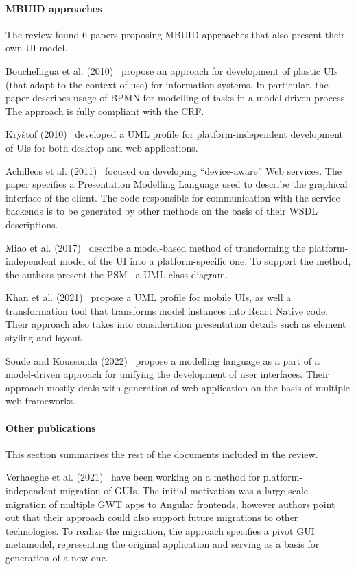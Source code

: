 \paragraph{MBUID approaches}

The review found 6 papers proposing MBUID approaches that also present their own UI model.

Bouchelligua et al. (2010)~\cite{Bouchelligua2010} propose an approach for development of plastic UIs (that adapt to the context of use) for information systems.
In particular, the paper describes usage of BPMN for modelling of tasks in a model-driven process.
The approach is fully compliant with the CRF\@.

Kryštof (2010)~\cite{kryvstof2010lpgm} developed a UML profile for platform-independent development of UIs for both desktop and web applications.

Achilleos et al. (2011)~\cite{Achilleos2011} focused on developing \enquote{device-aware} Web services.
The paper specifies a Presentation Modelling Language used to describe the graphical interface of the client.
The code responsible for communication with the service backends is to be generated by other methods on the basis of their WSDL descriptions.

Miao et al. (2017)~\cite{Miao2017} describe a model-based method of transforming the platform-independent model of the UI into a platform-specific one.
To support the method, the authors present the PSM \textendash\ a UML class diagram.

Khan et al. (2021)~\cite{Khan2021} propose a UML profile for mobile UIs, as well a transformation tool that transforms model instances into React Native code.
Their approach also takes into consideration presentation details such as element styling and layout.

Soude and Koussonda (2022)~\cite{Soude2022} propose a modelling language as a part of a model-driven approach for unifying the development of user interfaces.
Their approach mostly deals with generation of web application on the basis of multiple web frameworks.

\paragraph{Other publications}

This section summarizes the rest of the documents included in the review.

Verhaeghe et al. (2021)~\cite{Verhaeghe2021visual, Verhaeghe2021behavior} have been working on a method for platform-independent migration of GUIs.
The initial motivation was a large-scale migration of multiple GWT apps to Angular frontends, however authors point out that their approach could also support future migrations to other technologies.
To realize the migration, the approach specifies a pivot GUI metamodel, representing the original application and serving as a basis for generation of a new one.

